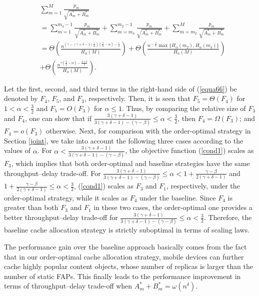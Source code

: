 \documentclass[10pt,journal,compsoc,onecolumn]{IEEEtran}
\begin{document}
\begin{align}\label{equa66}
&\sum_{m=1}^{M} \frac{p_m}{\sqrt{A_m^*+B_m^*}}\nonumber\\&=\!\sum_{m=1}^{m_4-1}\! \frac{p_m}{\sqrt{A_m^*\!+\!B_m^*}}\!+\!\sum_{m=m_4}^{m_2-1}\! \frac{p_m}{\sqrt{A_m^*\!+\!B_m^*}}\!+\!\sum_{m=m_2}^{M}\! \frac{p_m}{\sqrt{A_m^*\!+\!B_m^*}} \nonumber \\&=
\!\Theta\!\!\left(\!\!\frac{n^{\left(\!\gamma\!-\!(\!\gamma\!+\!\delta\!-\!1)\frac{1}{\alpha}\right)(\frac{3}{2}-\alpha)-\frac{1}{2}}}{H_{\alpha}(M)}\!\!\right)\!+\!\Theta\!\!\left(\!\frac{\!n^{\!-\!\frac{\delta}{2}}\!\max\!\lbrace\! H_{\alpha}\!(m_2)\!,\!H_{\alpha}\!(m_4)\!\rbrace\!}{H_{\alpha}(M)}\!\right) \!\!\nonumber \\&+\Theta\!\left(\!\frac{n^{\gamma(\frac{3}{2}\!-\!\alpha)\!-\!\frac{\beta+\delta}{2}}}{H_{\alpha}(M)}\!\right)\!.
\end{align}%

Let the first, second, and third terms in the right-hand side of
(\ref{equa66}) be denoted by $F_4$, $F_5$, and $F_3$,
respectively. Then, it is seen that $F_5=\Theta(F_4)$ for
$1<\alpha<\frac{3}{2}$ and $F_5=O(F_3)$ for $\alpha\leq 1$. Thus,
by comparing the relative size of $F_3$ and $F_4$, one can show
that if
$\frac{3(\gamma+\delta-1)}{3(\gamma+\delta-1)-(\gamma-\beta)}\leq
\alpha < \frac{3}{2}$, then $F_4=\Omega\left(F_3\right)$; and
$F_4=o\left(F_3\right)$ otherwise. Next, for comparison with the
order-optimal strategy in Section \ref{joint}, we take into account the
following three cases according to the values of $\alpha$. For
$\alpha<\frac{3(\gamma+\delta-1)}{3(\gamma+\delta-1)-(\gamma-\beta)}$,
the objective function (\ref{cond1}) scales as $F_3$, which
implies that both order-optimal and baseline strategies have the same
throughput--delay trade-off. For
$\frac{3(\gamma+\delta-1)}{3(\gamma+\delta-1)-(\gamma-\beta)}\leq
\alpha< 1+\frac{\gamma-\beta}{2(\gamma+\delta-1)}$ and
$1+\frac{\gamma-\beta}{2(\gamma+\delta-1)}\leq \alpha<
\frac{3}{2}$, (\ref{cond1}) scales as $F_3$ and $F_1$,
respectively, under the order-optimal strategy, while it scales as $F_4$
under the baseline. Since $F_4$ is greater than both $F_3$ and
$F_1$ in these two cases, the order-optimal one provides a better
throughput--delay trade-off for
$\frac{3(\gamma+\delta-1)}{3(\gamma+\delta-1)-(\gamma-\beta)}\leq
\alpha< \frac{3}{2}$. Therefore, the baseline cache allocation
strategy is strictly suboptimal in terms of scaling laws.

\begin{remark}
The performance gain over the baseline approach basically comes
from the fact that in our order-optimal cache allocation strategy,
mobile devices can further cache highly popular content objects,
whose number of replicas is larger than the number of static FAPs. This
finally leads to the performance improvement in terms of
throughput--delay trade-off when
$A_m^*+B_m^*=\omega\left(n^\delta\right)$.
\end{remark}
\end{document}
